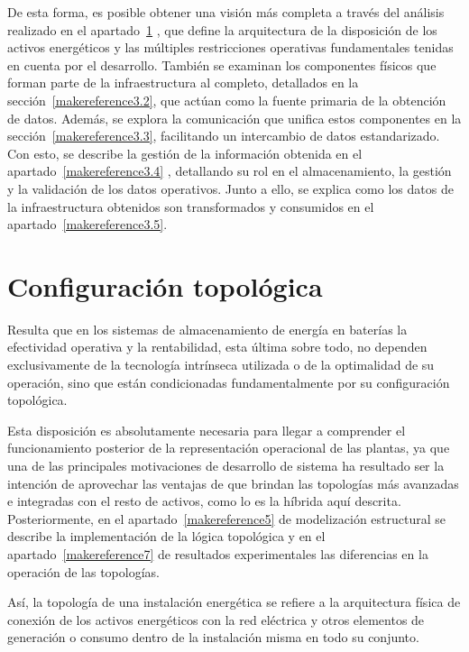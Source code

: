 De esta forma, es posible obtener una visión más completa a través del análisis realizado en el apartado~\ref{makereference3.1} , que define la arquitectura de la disposición de los activos energéticos y las múltiples restricciones operativas fundamentales tenidas en cuenta por el desarrollo. También se examinan los componentes físicos que forman parte de la infraestructura al completo, detallados en la sección~\ref{makereference3.2}, que actúan como la fuente primaria de la obtención de datos. Además, se explora la comunicación que unifica estos componentes en la sección~\ref{makereference3.3},  facilitando un intercambio de datos estandarizado. Con esto, se describe la gestión de la información obtenida en el apartado~\ref{makereference3.4} , detallando su rol en el almacenamiento, la gestión y la validación de los datos operativos. Junto a ello, se explica como los datos de la infraestructura obtenidos son transformados y consumidos en el apartado~\ref{makereference3.5}.

\section{Configuración topológica}
\label{makereference3.1}

Resulta que en los sistemas de almacenamiento de energía en baterías la efectividad operativa y la rentabilidad, esta última sobre todo, no dependen exclusivamente de la tecnología intrínseca utilizada o de la optimalidad de su operación, sino que están condicionadas fundamentalmente por su configuración topológica.

Esta disposición es absolutamente necesaria para llegar a comprender el funcionamiento posterior de la representación operacional de las plantas, ya que una de las principales motivaciones de desarrollo de sistema ha resultado ser la intención de aprovechar las ventajas de que brindan las topologías más avanzadas e integradas con el resto de activos, como lo es la híbrida aquí descrita. Posteriormente, en el apartado~\ref{makereference5} de modelización estructural se describe la implementación de la lógica topológica y en el apartado~\ref{makereference7} de resultados experimentales las diferencias en la operación de las topologías.

Así, la topología de una instalación energética se refiere a la arquitectura física de conexión de los activos energéticos con la red eléctrica y otros elementos de generación o consumo dentro de la instalación misma en todo su conjunto.

